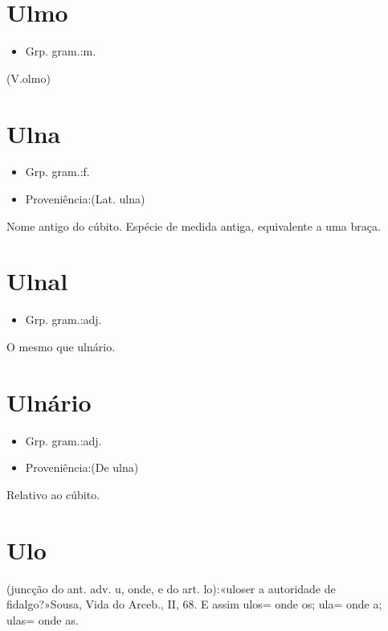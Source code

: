 \documentclass{article}
\begin{document}
\section{Ulmo}
\begin{itemize}
\item {Grp. gram.:m.}
\end{itemize}
(V.olmo)
\section{Ulna}
\begin{itemize}
\item {Grp. gram.:f.}
\end{itemize}
\begin{itemize}
\item {Proveniência:(Lat. \textunderscore ulna\textunderscore )}
\end{itemize}
Nome antigo do cúbito.
Espécie de medida antiga, equivalente a uma braça.
\section{Ulnal}
\begin{itemize}
\item {Grp. gram.:adj.}
\end{itemize}
O mesmo que \textunderscore ulnário\textunderscore .
\section{Ulnário}
\begin{itemize}
\item {Grp. gram.:adj.}
\end{itemize}
\begin{itemize}
\item {Proveniência:(De \textunderscore ulna\textunderscore )}
\end{itemize}
Relativo ao cúbito.
\section{Ulo}
(juncção do ant. adv. \textunderscore u\textunderscore , onde, e do art. \textunderscore lo\textunderscore ):«\textunderscore ulo\textunderscore  ser a autoridade de fidalgo?»Sousa, \textunderscore Vida do Arceb.\textunderscore , II, 68. E assim \textunderscore ulos\textunderscore  = \textunderscore onde os\textunderscore ; \textunderscore ula\textunderscore  = \textunderscore onde a\textunderscore ; \textunderscore ulas\textunderscore  = \textunderscore onde as\textunderscore .
\end{document}
